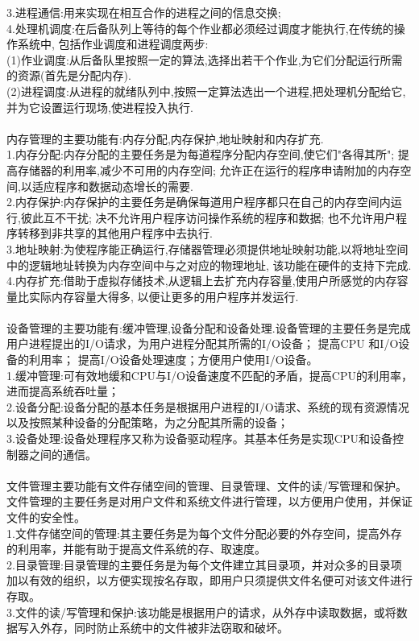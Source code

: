 \documentclass[UTF8]{article}
\begin{document}
    3.进程通信:用来实现在相互合作的进程之间的信息交换;\\
    4.处理机调度:在后备队列上等待的每个作业都必须经过调度才能执行,在传统的操作系统中,
    包括作业调度和进程调度两步:\\
    (1)作业调度:从后备队里按照一定的算法,选择出若干个作业,为它们分配运行所需的资源(首先是分配内存).\\
    (2)进程调度:从进程的就绪队列中,按照一定算法选出一个进程,把处理机分配给它,并为它设置运行现场,使进程投入执行.\\
    \\
    内存管理的主要功能有:内存分配,内存保护,地址映射和内存扩充.\\
    1.内存分配:内存分配的主要任务是为每道程序分配内存空间,使它们"各得其所";
    提高存储器的利用率,减少不可用的内存空间;
    允许正在运行的程序申请附加的内存空间,以适应程序和数据动态增长的需要.\\
    2.内存保护:内存保护的主要任务是确保每道用户程序都只在自己的内存空间内运行,彼此互不干扰;
    决不允许用户程序访问操作系统的程序和数据;
    也不允许用户程序转移到非共享的其他用户程序中去执行.\\
    3.地址映射:为使程序能正确运行,存储器管理必须提供地址映射功能,以将地址空间中的逻辑地址转换为内存空间中与之对应的物理地址,
    该功能在硬件的支持下完成.\\
    4.内存扩充:借助于虚拟存储技术,从逻辑上去扩充内存容量,使用户所感觉的内存容量比实际内存容量大得多,
    以便让更多的用户程序并发运行.\\
    \\
    设备管理的主要功能有:缓冲管理,设备分配和设备处理.设备管理的主要任务是完成用户进程提出的I/O请求，为用户进程分配其所需的I/O设备；
    提高CPU 和I/O设备的利用率；
    提高I/O设备处理速度；方便用户使用I/O设备。\\
    1.缓冲管理:可有效地缓和CPU与I/O设备速度不匹配的矛盾，提高CPU的利用率，进而提高系统吞吐量；\\
    2.设备分配:设备分配的基本任务是根据用户进程的I/O请求、系统的现有资源情况以及按照某种设备的分配策略，为之分配其所需的设备；\\
    3.设备处理:设备处理程序又称为设备驱动程序。其基本任务是实现CPU和设备控制器之间的通信。\\
    \\
    文件管理主要功能有文件存储空间的管理、目录管理、文件的读/写管理和保护。文件管理的主要任务是对用户文件和系统文件进行管理，以方便用户使用，并保证文件的安全性。\\
    1.文件存储空间的管理:其主要任务是为每个文件分配必要的外存空间，提高外存的利用率，并能有助于提高文件系统的存、取速度。\\
    2.目录管理:目录管理的主要任务是为每个文件建立其目录项，并对众多的目录项加以有效的组织，以方便实现按名存取，即用户只须提供文件名便可对该文件进行存取。\\
    3.文件的读/写管理和保护:该功能是根据用户的请求，从外存中读取数据，或将数据写入外存，同时防止系统中的文件被非法窃取和破坏。\\
\end{document}
